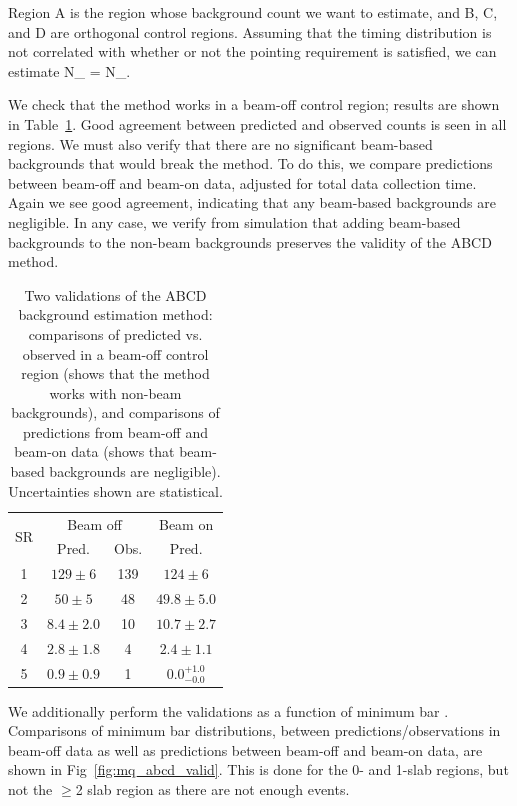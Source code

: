 {Region A is the region whose background count we want to estimate, and B, C, and D are orthogonal control regions. 
Assuming that the timing distribution is not correlated with whether or not the pointing requirement is satisfied, 
we can estimate
\be
N_ =  N_.
\ee

We check that the method works in a beam-off control region; results are shown in
Table~\ref{tab:mq_abcd_valid}. Good agreement between predicted and observed counts
is seen in all regions. We must also verify that there are no significant beam-based
backgrounds that would break the method. To do this, we compare predictions between
beam-off and beam-on data, adjusted for total data collection time. Again we see
good agreement, indicating that any beam-based backgrounds are negligible.
In any case, we verify from simulation that adding beam-based backgrounds
to the non-beam backgrounds preserves the validity of the ABCD method.

\begin{table}[t]
\caption{Two validations of the ABCD background estimation method:
comparisons of predicted vs. observed in a beam-off control region
(shows that the method works with non-beam backgrounds), and comparisons
of predictions from beam-off and beam-on data (shows that beam-based
backgrounds are negligible). Uncertainties shown are statistical.
\label{tab:mq_abcd_valid}}
\centering
\begin{tabular}{c|cc|c}
\multirow{2}{*}{SR} & \multicolumn{2}{c}{Beam off} & Beam on \\
\cline{2-4}
 & Pred. & Obs. & Pred. \\
\hline
1 & $129\pm6$ & 139 & $124\pm6$ \\
2 & $50\pm5$ & 48 & $49.8\pm5.0$ \\
3 & $8.4\pm2.0$ & 10 & $10.7\pm2.7$ \\
4 & $2.8\pm1.8$ & 4 & $2.4\pm1.1$ \\
5 & $0.9\pm0.9$ & 1 & $0.0^{+1.0}_{-0.0}$ \\
\hline
\end{tabular}
\end{table}

We additionally perform the validations as a function of minimum bar \Npe. Comparisons of
minimum bar \Npe distributions, between predictions/observations in beam-off data
as well as predictions between beam-off and beam-on data, are shown in 
Fig~\ref{fig:mq_abcd_valid}. This is done for the 0- and 1-slab regions,
but not the $\geq$2 slab region as there are not enough events.

}
